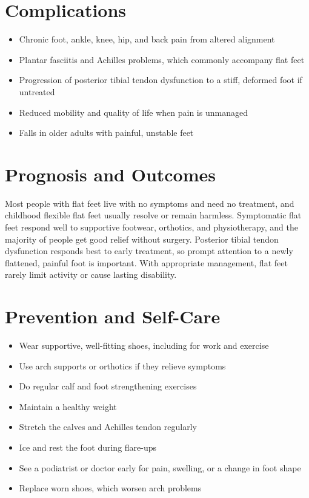 \section*{Complications}
\begin{itemize}
    \item Chronic foot, ankle, knee, hip, and back pain from altered alignment
    \item Plantar fasciitis and Achilles problems, which commonly accompany flat feet
    \item Progression of posterior tibial tendon dysfunction to a stiff, deformed foot if untreated
    \item Reduced mobility and quality of life when pain is unmanaged
    \item Falls in older adults with painful, unstable feet
\end{itemize}

\section*{Prognosis and Outcomes}
Most people with flat feet live with no symptoms and need no treatment, and childhood flexible flat feet usually resolve or remain harmless. Symptomatic flat feet respond well to supportive footwear, orthotics, and physiotherapy, and the majority of people get good relief without surgery. Posterior tibial tendon dysfunction responds best to early treatment, so prompt attention to a newly flattened, painful foot is important. With appropriate management, flat feet rarely limit activity or cause lasting disability.

\section*{Prevention and Self-Care}
\begin{itemize}
    \item Wear supportive, well-fitting shoes, including for work and exercise
    \item Use arch supports or orthotics if they relieve symptoms
    \item Do regular calf and foot strengthening exercises
    \item Maintain a healthy weight
    \item Stretch the calves and Achilles tendon regularly
    \item Ice and rest the foot during flare-ups
    \item See a podiatrist or doctor early for pain, swelling, or a change in foot shape
    \item Replace worn shoes, which worsen arch problems
\end{itemize}

